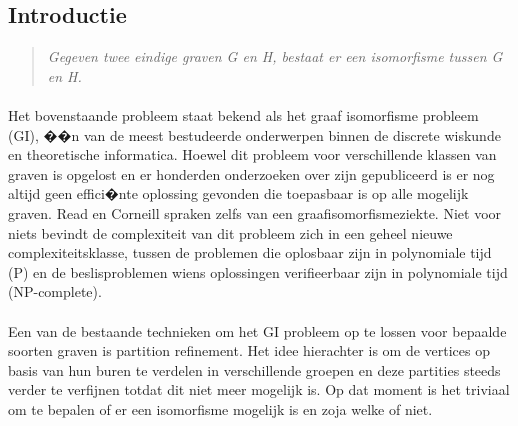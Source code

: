 \documentclass[twoside]{article}
\begin{document}
\begin{multicols}{2} %



\section{Introductie}

\begin{quote} 
\textit{Gegeven twee eindige graven G en H, bestaat er een isomorfisme tussen G en H.}
\end{quote}

\paragraph{} \noindent Het bovenstaande probleem staat bekend als het graaf isomorfisme probleem  (GI), ��n van de meest bestudeerde onderwerpen binnen de discrete wiskunde en theoretische informatica. Hoewel dit probleem voor verschillende klassen van graven is opgelost  en er honderden onderzoeken over zijn gepubliceerd is er nog altijd geen effici�nte oplossing gevonden die toepasbaar is op alle mogelijk graven. Read en Corneill spraken zelfs van een graafisomorfismeziekte. 
Niet voor niets bevindt de complexiteit van dit probleem zich in een geheel nieuwe complexiteitsklasse, tussen de problemen die oplosbaar zijn in polynomiale tijd (P) en de beslisproblemen wiens oplossingen verifieerbaar zijn in polynomiale tijd (NP-complete).  
 \paragraph{} \noindent Een van de bestaande technieken om het GI probleem op te lossen voor bepaalde soorten graven is partition refinement. Het idee hierachter is om de vertices op basis van hun buren te verdelen in verschillende groepen en deze partities steeds verder te verfijnen totdat dit niet meer mogelijk is. Op dat moment is het triviaal om te bepalen of er een isomorfisme mogelijk is en zoja welke of niet.

\end{multicols}
\end{document}
